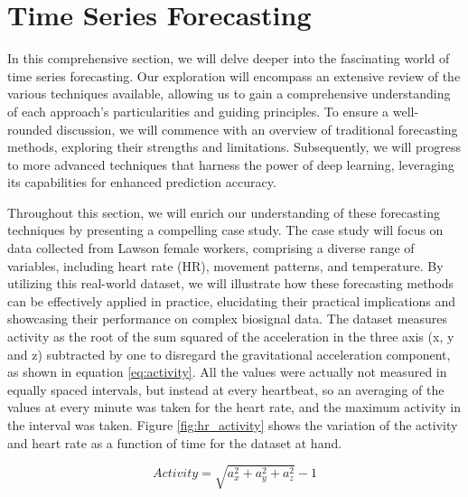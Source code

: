 \documentclass[../main.tex]{subfiles}
\begin{document}
    \section{Time Series Forecasting}
        In this comprehensive section, we will delve deeper into the fascinating world of time series forecasting. Our exploration will encompass an extensive review of the various techniques available, allowing us to gain a comprehensive understanding of each approach's particularities and guiding principles. To ensure a well-rounded discussion, we will commence with an overview of traditional forecasting methods, exploring their strengths and limitations. Subsequently, we will progress to more advanced techniques that harness the power of deep learning, leveraging its capabilities for enhanced prediction accuracy. \par

        Throughout this section, we will enrich our understanding of these forecasting techniques by presenting a compelling case study. The case study will focus on data collected from Lawson female workers, comprising a diverse range of variables, including heart rate (HR), movement patterns, and temperature. By utilizing this real-world dataset, we will illustrate how these forecasting methods can be effectively applied in practice, elucidating their practical implications and showcasing their performance on complex biosignal data. The dataset measures activity as the root of the sum squared of the acceleration in the three axis (x, y and z) subtracted by one to disregard the gravitational acceleration component, as shown in equation \ref{eq:activity}. All the values were actually not measured in equally spaced intervals, but instead at every heartbeat, so an averaging of the values at every minute was taken for the heart rate, and the maximum activity in the interval was taken. Figure \ref{fig:hr_activity} shows the variation of the activity and heart rate as a function of time for the dataset at hand. \par

        \begin{equation}
            \label{eq:activity}
            Activity = \sqrt{a_x^2+a_y^2+a_z^2}-1
        \end{equation}
\end{document}
